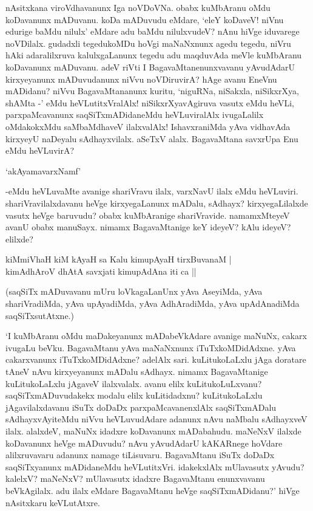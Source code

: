 nAsitxkana viroVdhavanunx Iga noVDoVNa. obabx kuMbAranu oMdu koDavanunx mADuvanu. koDa mADuvudu eMdare, `eleY koDaveV! niVnu edurige baMdu nilulx' eMdare adu baMdu nilulxvudeV? nAnu hiVge iduvarege noVDilalx. gudadxli tegedukoMDu hoVgi maNaNxnunx agedu tegedu, niVru hAki adaralilxruva kalulxgaLanunx tegedu adu maqduvAda meVle kuMbAranu koDavanunx mADuvanu. adeV riVti I BagavaMtanenunxvavanu yAvudAdarU kirxyeyanunx mADuvudanunx niVvu noVDiruvirA? hAge avanu EneVnu mADidanu? niVvu BagavaMtananunx kuritu, `niguRNa, niSakxla, niSikxrXya, shAMta -' eMdu heVLutitxVralAlx! niSikxrXyavAgiruva vasutx eMdu heVLi, parxpaMcavanunx saqSiTxmADidaneMdu heVLuviralAlx ivugaLalilx oMdakokxMdu saMbaMdhaveV ilalxvalAlx! IshavxraniMda yAva vidhavAda kirxyeyU naDeyalu sAdhayxvilalx. aSeTxV alalx. BagavaMtana savxrUpa Enu eMdu heVLuvirA?


\begin{shloka}
`akAyamavarxNamf'
\end{shloka}

-eMdu heVLuvaMte avanige shariVravu ilalx, varxNavU ilalx eMdu heVLuviri. shariVravilalxdavanu heVge kirxyegaLanunx mADalu, sAdhayx? kirxyegaLilalxde vasutx heVge baruvudu? obabx kuMbAranige shariVravide. namamxMteyeV avanU obabx manuSayx. nimamx BagavaMtanige keY ideyeV? kAlu ideyeV? elilxde?

\begin{shloka}
kiMmiVhaH kiM kAyaH sa Kalu kimupAyaH tirxBuvanaM |\\
kimAdhAroV dhAtA savxjati kimupAdAna iti ca ||
\end{shloka}

(saqSiTx mADuvavanu mUru loVkagaLanUnx yAva AseyiMda, yAva shariVradiMda, yAva upAyadiMda, yAva AdhAradiMda, yAva upAdAnadiMda saqSiTxsutAtxne.)

`I kuMbAranu oMdu maDakeyanunx mADabeVkAdare avanige maNuNx, cakarx ivugaLu beVku. BagavaMtanu yAva maNaNxnunx iTuTxkoMDidAdxne. yAva cakarxvanunx iTuTxkoMDidAdxne? adelAlx sari. kuLitukoLaLxlu jAga doratare tAneV nAvu kirxyeyanunx mADalu sAdhayx. nimamx BagavaMtanige kuLitukoLaLxlu jAgaveV ilalxvalalx. avanu elilx kuLitukoLuLxvanu? saqSiTxmADuvudakekx modalu elilx kuLitidadxnu? kuLitukoLaLxlu jAgavilalxdavanu iSuTx doDaDx parxpaMcavanenxlAlx saqSiTxmADalu sAdhayxvAyiteMdu niVvu heVLuvudAdare adanunx nAvu naMbalu sAdhayxveV ilalx. alalxdeV, maNuNx idadxre koDavanunx mADabahudu. maNeNxV ilalxde koDavanunx heVge mADuvudu? nAvu yAvudAdarU kAKARnege hoVdare alilxruvavaru adanunx namage tiLisuvaru. BagavaMtanu iSuTx doDaDx saqSiTxyanunx mADidaneMdu heVLutitxVri. idakekxlAlx mUlavasutx yAvudu? kalelxV? maNeNxV? mUlavasutx idadxre BagavaMtanu enunxvavanu beVkAgilalx. adu ilalx eMdare BagavaMtanu heVge saqSiTxmADidanu?' hiVge nAsitxkaru keVLutAtxre.

